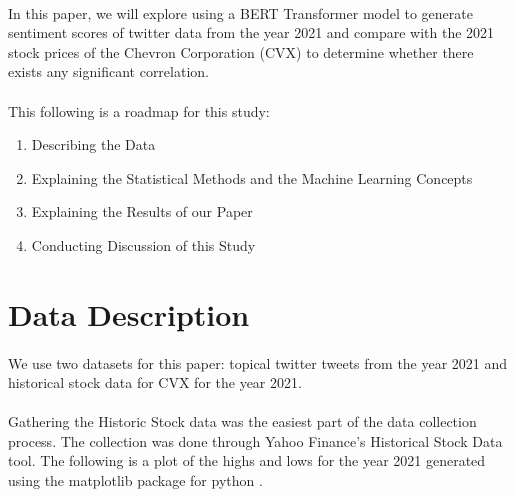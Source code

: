 \documentclass[12pt, letterpaper, titlepage]{article}
\begin{document}
\paragraph{}
	In this paper, we will explore using a BERT Transformer model to generate sentiment scores of twitter data from the year 2021 and compare with the 2021 stock prices of the Chevron Corporation (CVX) to determine whether there exists any significant correlation. 
\paragraph{}
	This following is a roadmap for this study: 
	\begin{enumerate}
	\item Describing the Data
	\item Explaining the Statistical Methods and the Machine Learning Concepts 
	\item Explaining the Results of our Paper
	\item Conducting Discussion of this Study
	\end{enumerate}
\label{sec: datadesc}
\section{Data Description}
\paragraph{}
	We use two datasets for this paper: topical twitter tweets from the year 2021 and historical stock data for CVX for the year 2021. 
\paragraph{}
	Gathering the Historic Stock data was the easiest part of the data collection process. The collection was done through Yahoo Finance's Historical Stock Data tool. The following is a plot of the highs and lows for the year 2021 generated using the matplotlib package for python \cite{Hunter_2007}.
\end{document}
